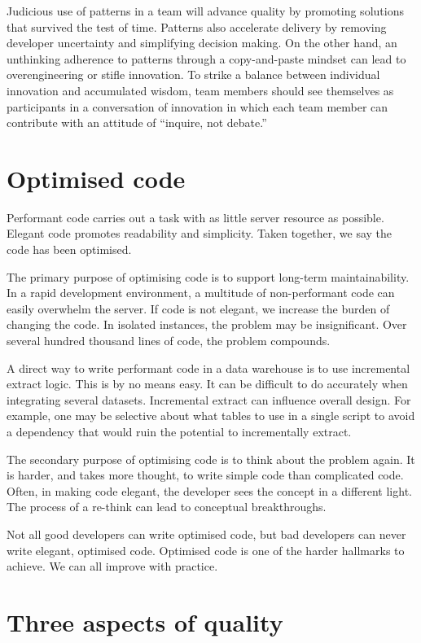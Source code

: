 \documentclass[10pt,openany,10pt]{book}
\begin{document}
Judicious use of patterns in a team will advance quality by promoting
solutions that survived the test of time. Patterns also accelerate
delivery by removing developer uncertainty and simplifying decision
making. On the other hand, an unthinking adherence to patterns through a
copy-and-paste mindset can lead to overengineering or stifle innovation.
To strike a balance between individual innovation and accumulated
wisdom, team members should see themselves as participants in a
conversation of innovation in which each team member can contribute with
an attitude of ``inquire, not debate.''

\section{Optimised code}\label{optimised-code}

Performant code carries out a task with as little server resource as
possible. Elegant code promotes readability and simplicity. Taken
together, we say the code has been optimised.

The primary purpose of optimising code is to support long-term
maintainability. In a rapid development environment, a multitude of
non-performant code can easily overwhelm the server. If code is not
elegant, we increase the burden of changing the code. In isolated
instances, the problem may be insignificant. Over several hundred
thousand lines of code, the problem compounds.

A direct way to write performant code in a data warehouse is to use
incremental extract logic. This is by no means easy. It can be difficult
to do accurately when integrating several datasets. Incremental extract
can influence overall design. For example, one may be selective about
what tables to use in a single script to avoid a dependency that would
ruin the potential to incrementally extract.

The secondary purpose of optimising code is to think about the problem
again. It is harder, and takes more thought, to write simple code than
complicated code. Often, in making code elegant, the developer sees the
concept in a different light. The process of a re-think can lead to
conceptual breakthroughs.

Not all good developers can write optimised code, but bad developers can
never write elegant, optimised code. Optimised code is one of the harder
hallmarks to achieve. We can all improve with practice.

\section{Three aspects of quality}\label{three-aspects-of-quality}
\end{document}
